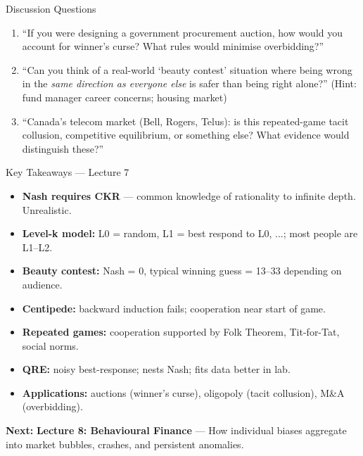 \documentclass[aspectratio=169]{beamer}
\begin{document}
\begin{frame}{Discussion Questions}
\begin{enumerate}
  \item[\textcolor{bepurple}{Q1.}] ``If you were designing a government procurement auction, how would you account for winner's curse? What rules would minimise overbidding?''
  \medskip
  \item[\textcolor{beteal}{Q2.}] ``Can you think of a real-world `beauty contest' situation where being wrong in the \textit{same direction as everyone else} is safer than being right alone?'' (Hint: fund manager career concerns; housing market)
  \medskip
  \item[\textcolor{berust}{Q3.}] ``Canada's telecom market (Bell, Rogers, Telus): is this repeated-game tacit collusion, competitive equilibrium, or something else? What evidence would distinguish these?''
\end{enumerate}
\end{frame}

\begin{frame}{Key Takeaways --- Lecture 7}
\begin{itemize}
  \item[\textcolor{beteal}{\checkmark}] \textbf{Nash requires CKR} --- common knowledge of rationality to infinite depth. Unrealistic.
  \item[\textcolor{beteal}{\checkmark}] \textbf{Level-k model:} L0 = random, L1 = best respond to L0, ...; most people are L1--L2.
  \item[\textcolor{beteal}{\checkmark}] \textbf{Beauty contest:} Nash = 0, typical winning guess = 13--33 depending on audience.
  \item[\textcolor{beteal}{\checkmark}] \textbf{Centipede:} backward induction fails; cooperation near start of game.
  \item[\textcolor{beteal}{\checkmark}] \textbf{Repeated games:} cooperation supported by Folk Theorem, Tit-for-Tat, social norms.
  \item[\textcolor{beteal}{\checkmark}] \textbf{QRE:} noisy best-response; nests Nash; fits data better in lab.
  \item[\textcolor{beteal}{\checkmark}] \textbf{Applications:} auctions (winner's curse), oligopoly (tacit collusion), M\&A (overbidding).
\end{itemize}
\medskip\textcolor{beblue}{\textbf{Next:}} \textbf{Lecture 8: Behavioural Finance} --- How individual biases aggregate into market bubbles, crashes, and persistent anomalies.
\end{frame}
\end{document}
